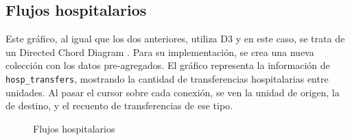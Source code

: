 \subsection{Flujos hospitalarios}
Este gráfico, al igual que los dos anteriores, utiliza D3 y en este caso, se trata de un Directed Chord Diagram \cite{chord}. Para su implementación, se crea una nueva colección con los datos pre-agregados. El gráfico representa la información de \texttt{hosp\_transfers}, mostrando la cantidad de transferencias hospitalarias entre unidades. Al pasar el cursor sobre cada conexión, se ven la unidad de origen, la de destino, y el recuento de transferencias de ese tipo.
\begin{figure}[H]
  \centering
  \caption{Flujos hospitalarios}
  \label{fig:chart-flows}
\end{figure}


